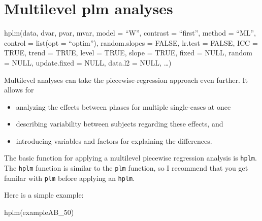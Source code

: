 \documentclass[
  letterpaper,
  DIV=11,
  numbers=noendperiod]{scrreprt}
\newenvironment{Shaded}{\begin{snugshade}}{\end{snugshade}}
\newcommand{\FunctionTok}[1]{\textcolor[rgb]{0.28,0.35,0.67}{#1}}
\newcommand{\NormalTok}[1]{\textcolor[rgb]{0.00,0.23,0.31}{#1}}
\providecommand{\tightlist}{%
  \setlength{\itemsep}{0pt}\setlength{\parskip}{0pt}}\usepackage{longtable,booktabs,array}
\begin{document}
\hypertarget{multilevel-plm-analyses}{%
\section{Multilevel plm analyses}\label{multilevel-plm-analyses}}

\begin{tcolorbox}[enhanced jigsaw, toprule=.15mm, colframe=quarto-callout-tip-color-frame, left=2mm, colback=white, breakable, bottomrule=.15mm, arc=.35mm, rightrule=.15mm, leftrule=.75mm, opacityback=0]
\begin{minipage}[t]{5.5mm}
\textcolor{quarto-callout-tip-color}{\faLightbulb}
\end{minipage}%
\begin{minipage}[t]{\textwidth - 5.5mm}
hplm(data, dvar, pvar, mvar, model = ``W'', contrast = ``first'', method
= ``ML'', control = list(opt = ``optim''), random.slopes = FALSE,
lr.test = FALSE, ICC = TRUE, trend = TRUE, level = TRUE, slope = TRUE,
fixed = NULL, random = NULL, update.fixed = NULL, data.l2 = NULL,
\ldots)\end{minipage}%
\end{tcolorbox}

Multilevel analyses can take the piecewise-regression approach even
further. It allows for

\begin{itemize}
\tightlist
\item
  analyzing the effects between phases for multiple single-cases at once
\item
  describing variability between subjects regarding these effects, and
\item
  introducing variables and factors for explaining the differences.
\end{itemize}

The basic function for applying a multilevel piecewise regression
analysis is \texttt{hplm}. The \texttt{hplm} function is similar to the
\texttt{plm} function, so I recommend that you get familar with
\texttt{plm} before applying an \texttt{hplm}.

Here is a simple example:

\begin{Shaded}
\begin{Highlighting}[]
\FunctionTok{hplm}\NormalTok{(exampleAB\_50)}
\end{Highlighting}
\end{Shaded}
\end{document}
